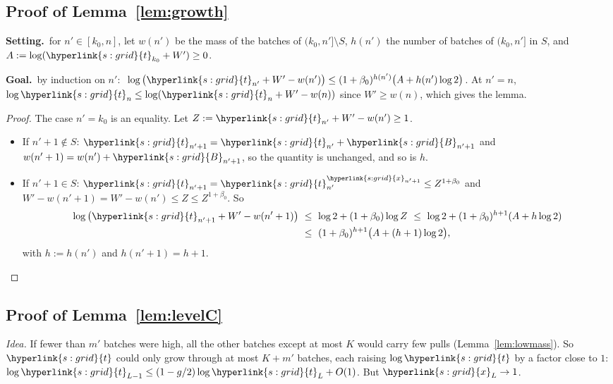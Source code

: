 \documentclass[10pt]{article}
\newcommand{\sy}[2]{{\hyperlink{#1}{#2}}}
\newcommand{\1}{\mathbf{1}}
\newcommand{\tl}{\sy{s:grid}{t}}
\newcommand{\xg}{\sy{s:grid}{x}}
\newcommand{\Bg}{\sy{s:grid}{B}}
\newcommand{\Setting}{\noindent\textbf{Setting.}\ }
\newcommand{\Goal}{\par\smallskip\noindent\textbf{Goal.}\ }
\begin{document}
\subsection{Proof of Lemma~\ref{lem:growth}}\label{sec:pf-lem:growth}
\begin{setgoal}
\Setting for $n'\in[k_0,n]$, let $w(n')$ be the mass of the batches of $(k_0,n']\setminus S$, $h(n')$ the number of batches of $(k_0,n']$ in $S$, and $A:=\log(\tl_{k_0}+W')\ge0$.
\Goal by induction on $n'$: $\ \log\big(\tl_{n'}+W'-w(n')\big)\le(1+\beta_0)^{h(n')}\big(A+h(n')\log2\big)$. At $n'=n$, $\log\tl_n\le\log(\tl_n+W'-w(n))$ since $W'\ge w(n)$, which
gives the lemma.
\end{setgoal}
\begin{proof}
The case $n'=k_0$ is an equality. Let $Z:=\tl_{n'}+W'-w(n')\ge1$.
\begin{itemize}
\item If $n'+1\notin S$: $\tl_{n'+1}=\tl_{n'}+\Bg_{n'+1}$ and $w(n'+1)=w(n')+\Bg_{n'+1}$, so the quantity is unchanged, and so is $h$.
\item If $n'+1\in S$: $\tl_{n'+1}=\tl_{n'}^{\xg_{n'+1}}\le Z^{1+\beta_0}$ and $W'-w(n'+1)=W'-w(n')\le Z\le Z^{1+\beta_0}$. So
\begin{align*}
\log\big(\tl_{n'+1}+W'-w(n'+1)\big)\ &\le\ \log2+(1+\beta_0)\log Z\ \le\ \log2+(1+\beta_0)^{h+1}(A+h\log2)\\
&\le\ (1+\beta_0)^{h+1}\big(A+(h+1)\log2\big),
\end{align*}
with $h:=h(n')$ and $h(n'+1)=h+1$.
\end{itemize}
\end{proof}

\subsection{Proof of Lemma~\ref{lem:levelC}}\label{sec:pf-lem:levelC}
\noindent\emph{Idea.} If fewer than $m'$ batches were high, all the other batches except at most $K$ would carry few pulls (Lemma~\ref{lem:lowmass}). So $\tl$ could only
grow through at most $K+m'$ batches, each raising $\log\tl$ by a factor close to $1$: $\log\tl_{L-1}\le(1-g/2)\log\tl_L+O(1)$. But $\xg_L\to1$.
\end{document}
